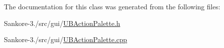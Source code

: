 The documentation for this class was generated from the following files\-:\begin{DoxyCompactItemize}
\item 
Sankore-\/3./src/gui/\hyperlink{_u_b_action_palette_8h}{U\-B\-Action\-Palette.\-h}\item 
Sankore-\/3./src/gui/\hyperlink{_u_b_action_palette_8cpp}{U\-B\-Action\-Palette.\-cpp}\end{DoxyCompactItemize}
